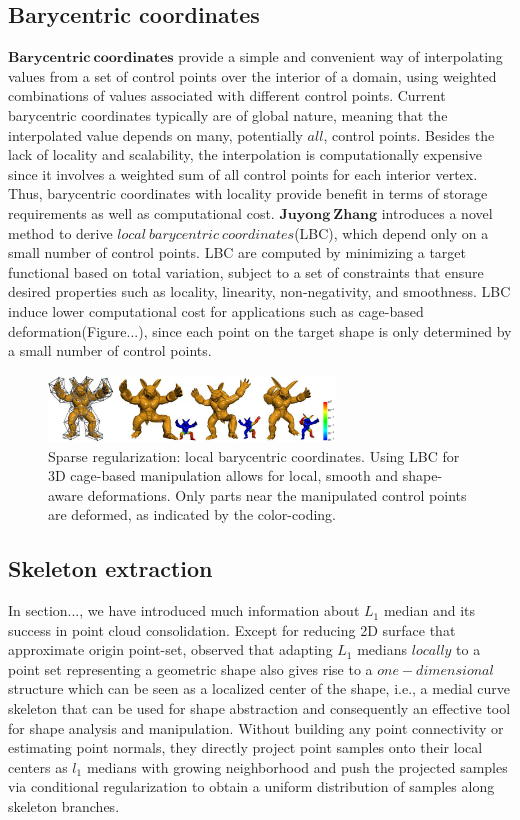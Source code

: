 \subsection{Barycentric coordinates}
$\mathbf{Barycentric~coordinates}$ provide a simple and convenient way of interpolating values from a set of control points over the interior of a domain, using weighted combinations of values associated with different control points. Current barycentric coordinates typically are of global nature, meaning that the interpolated value depends on many, potentially $all$, control points. Besides the lack of locality and scalability, the interpolation is computationally expensive since it involves a weighted sum of all control points for each interior vertex. Thus, barycentric coordinates with locality provide benefit in terms of storage requirements as well as computational cost. $\mathbf{Juyong~Zhang}$ introduces a novel method to derive $local~barycentric~coordinates$(LBC), which depend only on a small number of control points. LBC are computed by minimizing a target functional based on total variation, subject to a set of constraints that ensure desired properties such as locality, linearity, non-negativity, and smoothness. LBC induce lower computational cost for applications such as cage-based deformation(Figure...), since each point on the target shape is only determined by a small number of control points.

\begin{figure}[ht]
  \centering
  \includegraphics[width=3in]{images/LBC_L1}
  \caption{Sparse regularization: local barycentric coordinates\cite{}. Using LBC for 3D cage-based manipulation allows for local, smooth and shape-aware deformations. Only parts near the manipulated control points are deformed, as indicated by the color-coding.}
\end{figure}


\subsection{Skeleton extraction}
In section..., we have introduced much information about $L_1$ median and its success in point cloud consolidation.
Except for reducing 2D surface that approximate origin point-set, \cite{huang2013l1} observed that adapting $L_1$ medians $locally$ to a point set representing a geometric shape also gives rise to a $one-dimensional$ structure which can be seen as a localized center of the shape, i.e., a medial curve skeleton that can be used for shape abstraction and consequently an effective tool for shape analysis and manipulation\cite{cornea2007curve}.
Without building any point connectivity or estimating point normals, they directly project point samples onto their local centers as $l_1$ medians with growing neighborhood and push the projected samples via conditional regularization to obtain a uniform distribution of samples along skeleton branches.

